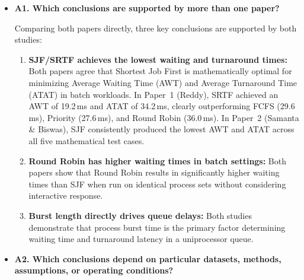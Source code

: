 \documentclass[11pt]{article}
\newcommand{\qLabel}[1]{
    {\fontsize{12}{14.4}\selectfont \textbf{#1}}
}
\begin{document}
\begin{itemize}[leftmargin=1.5em]

    \item \qLabel{A1. Which conclusions are supported by more than one paper?}
    \vspace{0.4em}
    
    Comparing both papers directly, three key conclusions are supported by both studies:
    \begin{enumerate}[label=(\alph*)]
        \item \textbf{SJF/SRTF achieves the lowest waiting and turnaround times:} Both papers agree that Shortest Job First is mathematically optimal for minimizing Average Waiting Time (AWT) and Average Turnaround Time (ATAT) in batch workloads. In Paper~1 (Reddy), SRTF achieved an AWT of 19.2\,ms and ATAT of 34.2\,ms, clearly outperforming FCFS (29.6\,ms), Priority (27.6\,ms), and Round Robin (36.0\,ms). In Paper~2 (Samanta \& Biswas), SJF consistently produced the lowest AWT and ATAT across all five mathematical test cases.
        \item \textbf{Round Robin has higher waiting times in batch settings:} Both papers show that Round Robin results in significantly higher waiting times than SJF when run on identical process sets without considering interactive response.
        \item \textbf{Burst length directly drives queue delays:} Both studies demonstrate that process burst time is the primary factor determining waiting time and turnaround latency in a uniprocessor queue.
    \end{enumerate}

    \vspace{0.8em}
    \item \qLabel{A2. Which conclusions depend on particular datasets, methods, assumptions, or operating conditions?}
    \vspace{0.4em}
    

\end{itemize}
\end{document}
